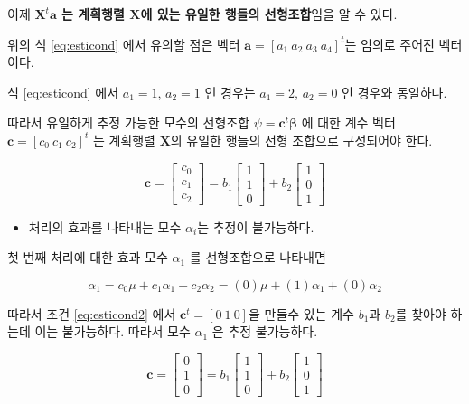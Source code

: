 \documentclass[
  10pt,
]{book}
\makeatletter
\providecommand{\tightlist}{%
  \setlength{\itemsep}{0pt}\setlength{\parskip}{0pt}}
\newenvironment{kframe}{%
\medskip{}
\setlength{\fboxsep}{.8em}
 \def\at@end@of@kframe{}%
 \ifinner\ifhmode%
  \def\at@end@of@kframe{\end{minipage}}%
  \begin{minipage}{\columnwidth}%
 \fi\fi%
 \def\FrameCommand##1{\hskip\@totalleftmargin \hskip-\fboxsep
 \colorbox{shadecolor}{##1}\hskip-\fboxsep
     \hskip-\linewidth \hskip-\@totalleftmargin \hskip\columnwidth}%
 \MakeFramed {\advance\hsize-\width
   \@totalleftmargin\z@ \linewidth\hsize
   \@setminipage}}%
 {\par\unskip\endMakeFramed%
 \at@end@of@kframe}
\newenvironment{rmdblock}[1]
  {
  \begin{itemize}
  \renewcommand{\labelitemi}{
    \raisebox{-.7\height}[0pt][0pt]{
      {\setkeys{Gin}{width=3em,keepaspectratio}\texttt{[image: images/\#1]}}
    }
  }
  \setlength{\fboxsep}{1em}
  \begin{kframe}
  \item
  }
  {
  \end{kframe}
  \end{itemize}
  }
\newenvironment{rmdnote}
  {\begin{rmdblock}{note}}
  {\end{rmdblock}}
\theoremstyle{definition}
\theoremstyle{definition}
\theoremstyle{definition}
\theoremstyle{definition}
\theoremstyle{remark}
\makeatother
\begin{document}
이제 \textbf{\(\bm X^t \bm a\) 는 계획행렬 \(\bm X\)에 있는 유일한 행들의 선형조합}임을 알 수 있다.

\begin{rmdnote}
위의 식 \eqref{eq:esticond} 에서 유의할 점은 벡터 \(\bm a=[a_1 ~a_2~a_3~a_4]^t\)는 임의로 주어진 벡터이다.

식 \eqref{eq:esticond} 에서 \(a_1=1\), \(a_2=1\) 인 경우는 \(a_1=2\), \(a_2=0\) 인 경우와 동일하다.
\end{rmdnote}

따라서 유일하게 추정 가능한 모수의 선형조합 \(\psi = \bm c^t \bm \beta\) 에 대한 계수 벡터 \(\bm c =[ c_0 ~ c_1 ~ c_2]^t\) 는 계획행렬 \(\bm X\)의 유일한 행들의 선형 조합으로 구성되어야 한다.

\begin{equation}
\bm c =
\begin{bmatrix}
c_0 \\
c_1 \\
c_2 
\end{bmatrix}
= 
b_1
\begin{bmatrix}
1 \\
1 \\
0 
\end{bmatrix}
+ 
b_2
\begin{bmatrix}
1 \\
0 \\
1 
\end{bmatrix}
\label{eq:esticond2}
\end{equation}

\begin{itemize}
\tightlist
\item
  처리의 효과를 나타내는 모수 \(\alpha_i\)는 추정이 불가능하다.
\end{itemize}

첫 번째 처리에 대한 효과 모수 \(\alpha_1\) 를 선형조합으로 나타내면

\[ \alpha_1 = c_0 \mu + c_1 \alpha_1 + c_2 \alpha_2 = (0) \mu + (1) \alpha_1 + (0) \alpha_2 \]

따라서 조건 \eqref{eq:esticond2} 에서 \(\bm c^t = [0~1~0]\)을 만들수 있는 계수 \(b_1\)과 \(b_2\)를 찾아야 하는데 이는 불가능하다. 따라서 모수 \(\alpha_1\) 은 추정 불가능하다.

\begin{equation*}
\bm c =
\begin{bmatrix}
0 \\
1 \\
0 
\end{bmatrix}
= 
b_1
\begin{bmatrix}
1 \\
1 \\
0 
\end{bmatrix}
+ 
b_2
\begin{bmatrix}
1 \\
0 \\
1 
\end{bmatrix}
\end{equation*}
\end{document}
